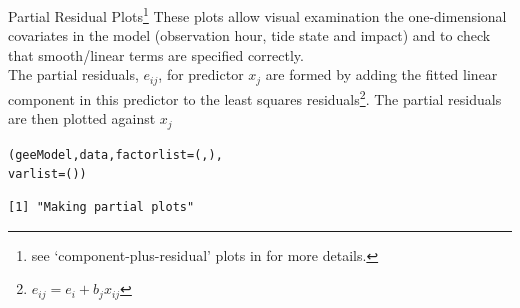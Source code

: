 \begin{frame}[fragile]
\begin{block}{Partial Residual Plots\footnote{see `component-plus-residual' plots in \citet{Fox2011} for more details.}}
These plots allow visual examination the one-dimensional covariates in the model (observation hour, tide state and impact) and to check that smooth/linear terms are specified correctly.\\

\noindent The partial residuals, $e_{ij}$,  for predictor $x_j$ are formed by adding the fitted linear component in this predictor to the least squares residuals\footnote{$e_{ij} = e_i + b_jx_{ij}$}.  The partial residuals are then plotted against $x_j$
\end{block}

\begin{knitrout}\footnotesize
{}\color{fgcolor}\begin{kframe}
\begin{alltt}
(geeModel, data, factorlist = (, ), 
    varlist = ())
\end{alltt}
\begin{verbatim}
[1] "Making partial plots"
\end{verbatim}
\end{kframe}
\end{knitrout}

\end{frame}

